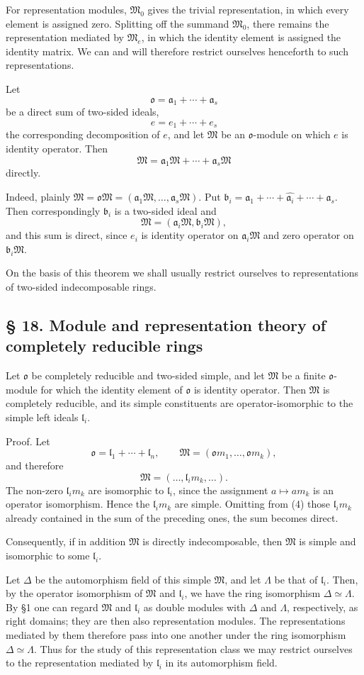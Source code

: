 \documentclass[11pt]{article}
\providecommand{\mM}{\mathfrak{M}}
\providecommand{\mo}{\mathfrak{o}}
\providecommand{\ma}{\mathfrak{a}}
\providecommand{\mb}{\mathfrak{b}}
\providecommand{\ml}{\mathfrak{l}}
\begin{document}
For representation modules, $\mM_0$ gives the trivial representation, in which every element is assigned zero. Splitting off the summand $\mM_0$, there remains the representation mediated by $\mM_e$, in which the identity element is assigned the identity matrix. We can and will therefore restrict ourselves henceforth to such representations.

Let
\[
        \mo=\ma_1+\cdots+\ma_s
\]
be a direct sum of two-sided ideals,
\[
        e=e_1+\cdots+e_s
\]
the corresponding decomposition of $e$, and let $\mM$ be an $\mo$-module on which $e$ is identity operator. Then
\[
        \mM=\ma_1\mM+\cdots+\ma_s\mM
\]
directly.

Indeed, plainly $\mM=\mo\mM=(\ma_1\mM,\ldots,\ma_s\mM)$. Put $\mb_i=\ma_1+\cdots+\widehat{\ma_i}+\cdots+\ma_s$. Then correspondingly $\mb_i$ is a two-sided ideal and
\[
        \mM=(\ma_i\mM,\mb_i\mM),
\]
and this sum is direct, since $e_i$ is identity operator on $\ma_i\mM$ and zero operator on $\mb_i\mM$.

On the basis of this theorem we shall usually restrict ourselves to representations of two-sided indecomposable rings.

\subsection*{§ 18. Module and representation theory of completely reducible rings}
Let $\mo$ be completely reducible and two-sided simple, and let $\mM$ be a finite $\mo$-module for which the identity element of $\mo$ is identity operator. Then $\mM$ is completely reducible, and its simple constituents are operator-isomorphic to the simple left ideals $\ml_i$.

Proof. Let
\[
        \mo=\ml_1+\cdots+\ml_n,
        \qquad
        \mM=(\mo m_1,\ldots,\mo m_k),
\]
and therefore
\[
        \mM=(\ldots,\ml_i m_k,\ldots).                         \tag{4}
\]
The non-zero $\ml_i m_k$ are isomorphic to $\ml_i$, since the assignment $a\mapsto am_k$ is an operator isomorphism. Hence the $\ml_i m_k$ are simple. Omitting from (4) those $\ml_i m_k$ already contained in the sum of the preceding ones, the sum becomes direct.

Consequently, if in addition $\mM$ is directly indecomposable, then $\mM$ is simple and isomorphic to some $\ml_i$.

Let $\Delta$ be the automorphism field of this simple $\mM$, and let $\Lambda$ be that of $\ml_i$. Then, by the operator isomorphism of $\mM$ and $\ml_i$, we have the ring isomorphism $\Delta\simeq\Lambda$. By §1 one can regard $\mM$ and $\ml_i$ as double modules with $\Delta$ and $\Lambda$, respectively, as right domains; they are then also representation modules. The representations mediated by them therefore pass into one another under the ring isomorphism $\Delta\simeq\Lambda$. Thus for the study of this representation class we may restrict ourselves to the representation mediated by $\ml_i$ in its automorphism field.
\end{document}
